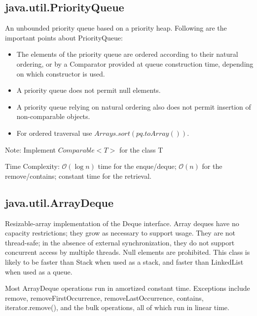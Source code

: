\documentclass[a4paper]{article}
\begin{document}
\subsection{java.util.PriorityQueue}
An unbounded priority queue based on a priority heap. Following are the important points about PriorityQueue:
\begin{itemize}
  \item The elements of the priority queue are ordered according to their natural ordering, or by a Comparator provided at queue construction time, depending on which constructor is used.
  \item A priority queue does not permit null elements.
  \item A priority queue relying on natural ordering also does not permit insertion of non-comparable objects.
  \item For ordered traversal use \textit{$Arrays.sort(pq.toArray())$}.
\end{itemize}
Note: Implement \textit{$Comparable<T>$} for the class T

Time Complexity: $\mathcal{O}(\log{}n)$ time for the enque/deque; $\mathcal{O}(n)$ for the remove/contains; constant time for the retrieval.

\subsection{java.util.ArrayDeque}
Resizable-array implementation of the Deque interface. Array deques have no capacity restrictions; they grow as necessary to support usage. They are not thread-safe; in the absence of external synchronization, they do not support concurrent access by multiple threads. Null elements are prohibited. This class is likely to be faster than Stack when used as a stack, and faster than LinkedList when used as a queue.

Most ArrayDeque operations run in amortized constant time. Exceptions include remove, removeFirstOccurrence, removeLastOccurrence, contains, iterator.remove(), and the bulk operations, all of which run in linear time.
\end{document}
